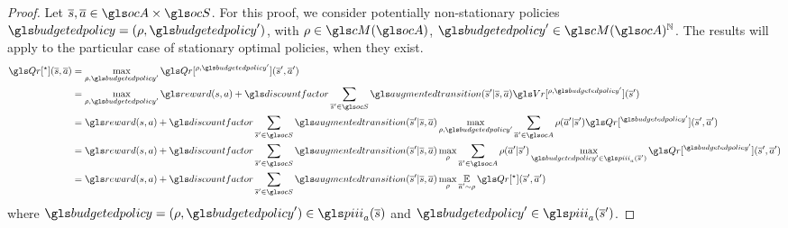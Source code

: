 \begin{subappendices}
\begin{proof}
    Let $\os, \oa \in \ocA\times\ocS$. For this proof, we consider potentially non-stationary policies $\budgetedpolicy=(\rho, \budgetedpolicy')$, with $\rho\in\cM(\ocA)$, $\budgetedpolicy'\in\cM(\ocA)^\Natural$. The results will apply to the particular case of stationary optimal policies, when they exist.
    \begin{align}
        \Qr[^\star](\os, \oa) &=  \max_{\rho, \budgetedpolicy'} \Qr[^{\rho, \budgetedpolicy'}](\os', \oa') \label{eq:pthm_def}\\
        &= \max_{\rho, \budgetedpolicy'} \reward(s, a) + \discountfactor \sum_{\os'\in\ocS} \augmentedtransition(\os' | \os, \oa) \Vr[^{\rho, \budgetedpolicy'}](\os') \label{eq:pthm_exp}\\
        &= \reward(s, a) + \discountfactor \sum_{\os'\in\ocS}  \augmentedtransition(\os' | \os, \oa) \max_{\rho, \budgetedpolicy'} \sum_{\oa'\in\ocA} \rho(\oa' | \os')\Qr[^{\budgetedpolicy'}](\os', \oa') \label{eq:pthm_marg}\\
        &= \reward(s, a) + \discountfactor \sum_{\os'\in\ocS}  \augmentedtransition(\os' | \os, \oa) \max_\rho\sum_{\oa'\in\ocA}\rho(\oa' | \os')\max_{\budgetedpolicy'\in\policies_a(\os')}\Qr[^{\budgetedpolicy'}](\os', \oa') \label{eq:pthm_max}\\
        &= \reward(s, a) + \discountfactor \sum_{\os'\in\ocS}  \augmentedtransition(\os' | \os, \oa) \max_\rho\expectedvalueover{\oa'\sim\rho}\Qr[^\star](\os', \oa') \label{eq:pthm_marg_def2}
    \end{align}
    where $\budgetedpolicy = (\rho, \budgetedpolicy')\in\policies_a(\os)$ and $\budgetedpolicy'\in\policies_a(\os')$.


\end{proof}
\end{subappendices}
